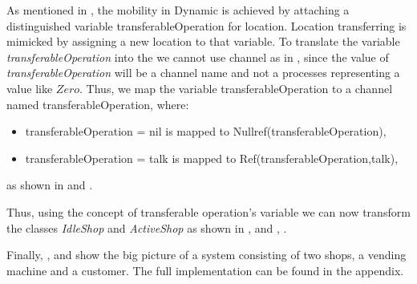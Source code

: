 As mentioned in , the mobility in Dynamic \oz{} is achieved
by attaching a distinguished variable transferableOperation for location. Location transferring
is mimicked by assigning a new location to that variable. To translate the variable \emph{transferableOperation} into the \picalc{} we cannot use \picalc{} channel as in , since the value of \emph{transferableOperation} will be a channel name and not a processes representing a value like $Zero$. Thus, we map the variable transferableOperation to a channel named transferableOperation, where:

\begin{itemize}
\item transferableOperation = nil is mapped to Nullref(transferableOperation),

\item transferableOperation = talk is mapped to Ref(transferableOperation,talk),
\end{itemize}
as shown in  and .

Thus, using the concept of transferable operation's variable we can now transform the classes \textit{IdleShop} and \textit{ActiveShop} as shown in ,  and , .



Finally, ,  and  show the big picture of a system consisting of two shops, a vending machine and a customer. The full implementation can be found in the appendix.
